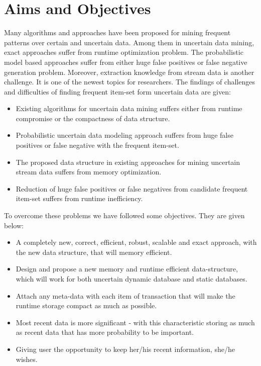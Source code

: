 \section{Aims and Objectives}
Many algorithms and approaches have been proposed for mining frequent patterns over certain and uncertain data. Among them in uncertain data mining, exact approaches suffer from runtime optimization problem. The probabilistic model based approaches suffer from either huge false positives or false negative generation problem. Moreover, extraction knowledge from stream data is another challenge. It is one of the newest topics for researchers. The findings of challenges and difficulties of finding frequent item-set form uncertain data are given:
\begin{itemize}
    \item Existing algorithms for uncertain data mining suffers either from runtime compromise or the compactness of data structure.
    \item Probabilistic uncertain data modeling approach suffers from huge false positives or false negative with the frequent item-set.
    \item The proposed data structure in existing approaches for mining uncertain stream data suffers from memory optimization.
    \item Reduction of huge false positives or false negatives from candidate frequent item-set suffers from runtime inefficiency.
\end{itemize}
To overcome these problems we have followed some objectives. They are given below:
\begin{itemize}
    \item A completely new, correct, efficient, robust, scalable and exact approach, with the new data structure, that will memory efficient.
    \item Design and propose a new memory and runtime efficient data-structure, which will work for both uncertain dynamic database and static databases.
    \item Attach any meta-data with each item of transaction that will make the runtime storage compact as much as possible.
    \item Most recent data is more significant - with this characteristic storing as much as recent data that has more probability to be important.
   \item Giving user the opportunity to keep her/his recent information, she/he wishes. 
\end{itemize}

